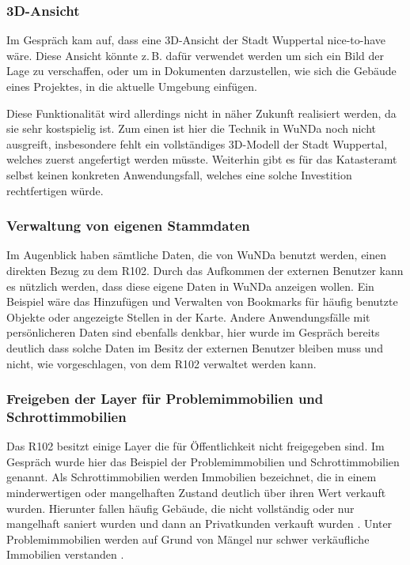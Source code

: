 \subsubsection{3D-Ansicht}
Im Gespräch kam auf, dass eine 3D-Ansicht der Stadt Wuppertal nice-to-have wäre.
Diese Ansicht könnte z.\,B. dafür verwendet werden um sich ein Bild der Lage zu verschaffen, oder um in Dokumenten darzustellen, wie sich die Gebäude eines Projektes, in die aktuelle Umgebung einfügen.

Diese Funktionalität wird allerdings nicht in näher Zukunft realisiert werden, da sie sehr kostspielig ist.
Zum einen ist hier die Technik in \ac{WuNDa} noch nicht ausgreift, insbesondere fehlt ein vollständiges 3D-Modell der Stadt Wuppertal, welches zuerst angefertigt werden müsste.
Weiterhin gibt es für das Katasteramt selbst keinen konkreten Anwendungsfall, welches eine solche Investition rechtfertigen würde.  

\subsubsection{Verwaltung von eigenen Stammdaten}
Im Augenblick haben sämtliche Daten, die von \ac{WuNDa} benutzt werden, einen direkten Bezug zu dem R102.
Durch das Aufkommen der externen Benutzer kann es nützlich werden, dass diese eigene Daten in \ac{WuNDa} anzeigen wollen.
Ein Beispiel wäre das Hinzufügen und Verwalten von Bookmarks für häufig benutzte Objekte oder angezeigte Stellen in der Karte.
Andere Anwendungsfälle mit persönlicheren Daten sind ebenfalls denkbar, hier wurde im Gespräch bereits deutlich dass solche Daten im Besitz der externen Benutzer bleiben muss und nicht, wie vorgeschlagen, von dem R102 verwaltet werden kann.
\subsubsection{Freigeben der Layer für Problemimmobilien und Schrottimmobilien}
Das R102 besitzt einige Layer die für Öffentlichkeit nicht freigegeben sind.
Im Gespräch wurde hier das Beispiel der Problemimmobilien und Schrottimmobilien genannt.
Als Schrottimmobilien werden Immobilien bezeichnet, die in einem minderwertigen oder mangelhaften Zustand deutlich über ihren Wert verkauft wurden.
Hierunter fallen häufig Gebäude, die nicht vollständig oder nur mangelhaft saniert wurden und dann an Privatkunden verkauft wurden \autocite[vgl.][]{iva-schrottimmo}.
Unter Problemimmobilien werden auf Grund von Mängel nur schwer verkäufliche Immobilien verstanden \autocite[vgl.][]{immo-problemimmo}.

